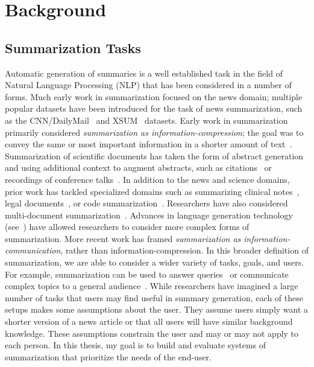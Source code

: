 \chapter{Background} \label{chap:background}


\section{Summarization Tasks}\label{sec:background-tasks}

Automatic generation of summaries is a well established task in the field of Natural Language Processing (NLP) that has been considered in a number of forms. Much early work in summarization focused on the news domain; multiple popular datasets have been introduced for the task of news summarization, such as the CNN/DailyMail~\cite{see-etal-2017-get} and XSUM~\cite{xsum-narayan-etal-2018-dont} datasets. Early work in summarization primarily considered \textit{summarization as information-compression}; the goal was to convey the same or most important information in a shorter amount of text~\cite{knight2002summarization, clarke2008global}. Summarization of scientific documents has taken the form of abstract generation~\cite{cohan2018discourse} and using additional context to augment abstracts, such as citations~\cite{Qazvinian2008ScientificPS, Cohan2015ScientificAS} or recordings of conference talks~\cite{Lev2019TalkSummAD}. In addition to the news and science domains, prior work has tackled specialized domains such as summarizing clinical notes~\cite{Abacha2023OverviewOT}, legal documents~\cite{Takale2023ASO}, or code summarization~\cite{Ahmad2020ATA}. Researchers have also considered multi-document summarization~\cite{DeYoung2021MS2MS, Fabbri2019MultiNewsAL}. Advances in language generation technology (see~) have allowed researchers to consider more complex forms of summarization. More recent work has framed \textit{summarization as information-communication}, rather than information-compression. In this broader definition of summarization, we are able to consider a wider variety of tasks, goals, and users. For example, summarization can be used to answer queries~\cite{Nema2017DiversityDA, Fok2023QlarifyRE} or communicate complex topics to a general audience~\cite{goldsack2022making,Zaman2020HTSSAN}.  While researchers have imagined a large number of tasks that users may find useful in summary generation, each of these setups makes some assumptions about the user. They assume users simply want a shorter version of a news article or that all users will have similar background knowledge. These assumptions  constrain the user and may or may not apply to each person. In this thesis, my goal is to build and evaluate systems of summarization that prioritize the needs of the end-user.


